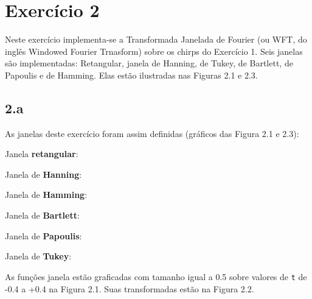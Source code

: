 
\section*{\large Exercício 2}
%

Neste exercício implementa-se a Transformada Janelada de Fourier (ou WFT, do inglês Windowed Fourier Trnasform) sobre os chirps do Exercício 1. Seis janelas são implementadas: Retangular, janela de Hanning, de Tukey, de Bartlett, de Papoulis e de Hamming. Elas estão ilustradas nas Figuras 2.1 e 2.3.

\subsection*{2.a} 
%

As janelas deste exercício foram assim definidas (gráficos das Figura 2.1 e 2.3):

Janela \textbf{retangular}:



Janela de \textbf{Hanning}:



Janela de \textbf{Hamming}:



Janela de \textbf{Bartlett}:



Janela de \textbf{Papoulis}:



Janela de \textbf{Tukey}:



As funções janela estão graficadas com tamanho igual a 0.5 sobre valores de \texttt{t} de -0.4 a +0.4 na Figura 2.1. Suas transformadas estão na Figura 2.2.

